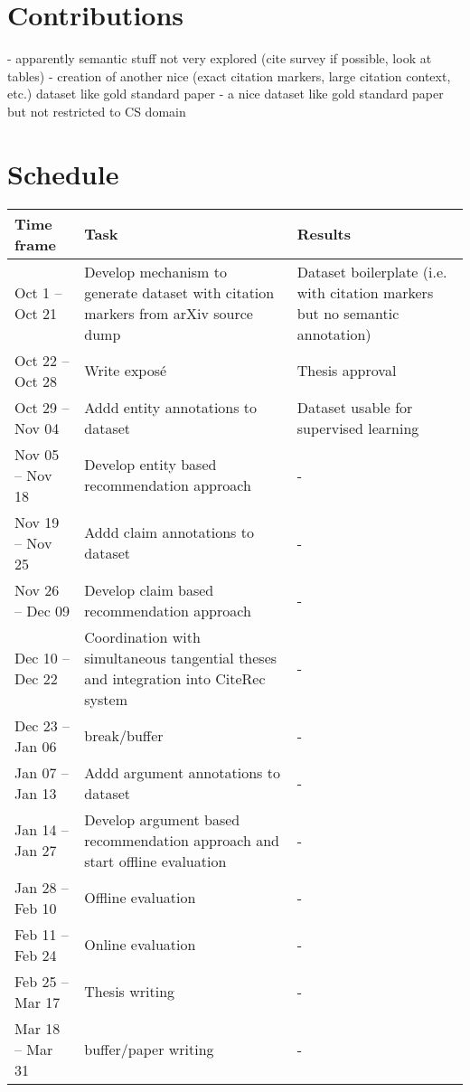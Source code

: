\documentclass{proseminar}
\begin{document}
\section{Contributions}
- apparently semantic stuff not very explored (cite survey if possible, look at tables)  
- creation of another nice (exact citation markers, large citation context, etc.) dataset like gold standard paper\cite{Faerber2018}  
- a nice dataset like gold standard paper\cite{Faerber2018} but not restricted to CS domain

\section{Schedule}
\begin{table*}
\centering
\begin{tabular}{|p{2.5cm}|p{6cm}|p{4cm}|} \hline
Time frame&Task&Results\\ \hline
Oct 1 -- Oct 21 & Develop mechanism to generate dataset with citation markers from arXiv source dump & Dataset boilerplate (i.e. with citation markers but no semantic annotation)\\ \hline
Oct 22 -- Oct 28 & Write expos\'e  & Thesis approval\\ \hline
Oct 29 -- Nov 04 & Addd entity annotations to dataset & Dataset usable for supervised learning\\ \hline
Nov 05 -- Nov 18 & Develop entity based recommendation approach & -\\ \hline
Nov 19 -- Nov 25 & Addd claim annotations to dataset & -\\ \hline
Nov 26 -- Dec 09 & Develop claim based recommendation approach & -\\ \hline
Dec 10 -- Dec 22 & Coordination with simultaneous tangential theses and integration into CiteRec system & -\\ \hline
Dec 23 -- Jan 06 & break/buffer & -\\ \hline
Jan 07 -- Jan 13 & Addd argument annotations to dataset & -\\ \hline
Jan 14 -- Jan 27 & Develop argument based recommendation approach and start offline evaluation & -\\ \hline
Jan 28 -- Feb 10 & Offline evaluation & -\\ \hline
Feb 11 -- Feb 24 & Online evaluation & -\\ \hline
Feb 25 -- Mar 17 & Thesis writing & -\\ \hline
Mar 18 -- Mar 31 & buffer/paper writing & -\\ \hline\end{tabular}
\end{table*}
\end{document}
